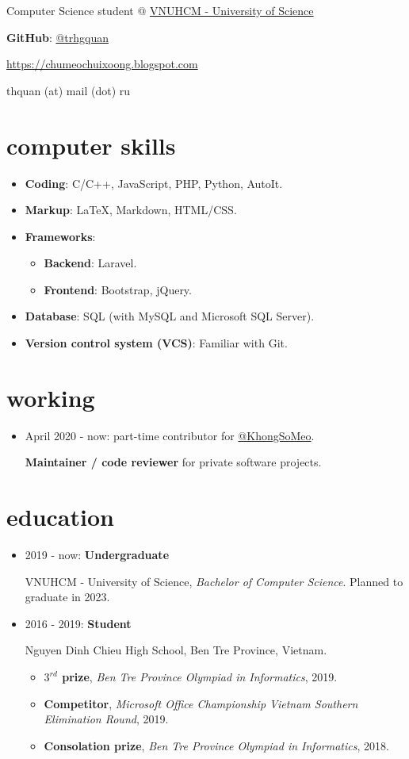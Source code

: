 \documentclass{article}
\makeatletter
\renewcommand{\maketitle}{
\begin{multicols}{2}
\begin{flushleft}
{\huge\bfseries\theauthor}

Computer Science student @ \href{https://hcmus.edu.vn}{VNUHCM - University of Science}
\end{flushleft}

\columnbreak

\begin{flushright}


\textbf{GitHub}: \href{https://github.com/trhgquan}{@trhgquan}

\href{https://chumeochuixoong.blogspot.com}{https://chumeochuixoong.blogspot.com}

thquan (at) mail (dot) ru
\end{flushright}
\end{multicols}
}
\makeatother
\begin{document}
\author{Quan, Tran Hoang}
\maketitle

\section{computer skills}
\begin{itemize}
\item \textbf{Coding}: C/C++, JavaScript, PHP, Python, AutoIt.
\item \textbf{Markup}: \LaTeX, Markdown, HTML/CSS.
\item \textbf{Frameworks}:
\begin{itemize}
\item \textbf{Backend}: Laravel.
\item \textbf{Frontend}: Bootstrap, jQuery.
\end{itemize}
\item \textbf{Database}: SQL (with MySQL and Microsoft SQL Server).
\item \textbf{Version control system (VCS)}: Familiar with Git.
\end{itemize}

\section{working}
\begin{itemize}
\item April 2020 - now: part-time contributor for \href{https://github.com/khongsomeo}{@KhongSoMeo}.

\textbf{Maintainer / code reviewer} for private software projects.
\end{itemize}

\section{education}
\begin{itemize}
\item 2019 - now: \textbf{Undergraduate}

VNUHCM - University of Science, \textit{Bachelor of Computer Science}. Planned to graduate in 2023.

\item 2016 - 2019: \textbf{Student}

Nguyen Dinh Chieu High School, Ben Tre Province, Vietnam.
\begin{itemize}
\item \textbf{$3^{rd}$ prize}, \textit{Ben Tre Province Olympiad in Informatics}, 2019.
\item \textbf{Competitor}, \textit{Microsoft Office Championship Vietnam Southern Elimination Round}, 2019.
\item \textbf{Consolation prize}, \textit{Ben Tre Province Olympiad in Informatics}, 2018.
\end{itemize}
\end{itemize}
\end{document}
